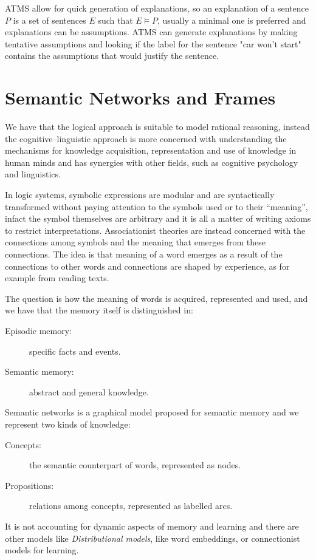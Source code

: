 ATMS allow for quick generation of explanations, so an explanation of a sentence
$P$ is a set of sentences $E$ such that $E \models P$, usually a minimal
one is preferred and explanations can be assumptions.\newline
ATMS can generate explanations by making tentative assumptions and looking if the
label for the sentence  "car won’t start" contains the assumptions
that would justify the sentence.

\section{Semantic Networks and Frames}
We have that the logical approach is suitable to model rational reasoning, instead 
the cognitive–linguistic approach is more concerned with understanding the mechanisms
for knowledge acquisition, representation and use of knowledge in human minds and 
has synergies with other fields, such as cognitive psychology and linguistics.

In logic systems, symbolic expressions are modular and are syntactically transformed
without paying attention to the symbols used or to their “meaning”, infact 
the symbol themselves are arbitrary and it is all a matter of writing axioms 
to restrict interpretations.\newline
Associationist theories are instead concerned with the connections among symbols and
the meaning that emerges from these connections.\newline
The idea is that meaning of a word emerges as a result of the connections to other words
and connections are shaped by experience, as for example from reading texts.

The question is how the meaning of words is acquired, represented and used, and we have that
the memory itself is distinguished in:
\begin{description}
   \item [Episodic memory: ] specific facts and events.
   \item [Semantic memory: ] abstract and general knowledge.
\end{description}
Semantic networks is a graphical model proposed for semantic memory and we 
represent two kinds of knowledge:
\begin{description}
   \item [Concepts: ] the semantic counterpart of words, represented as nodes.
   \item [Propositions: ] relations among concepts, represented as labelled arcs.
\end{description}
It is not accounting for dynamic aspects of memory and learning and there are other models
like \emph{Distributional models}, like word embeddings,
or connectionist models for learning.

